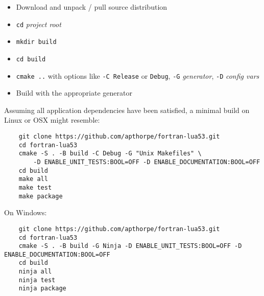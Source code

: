 \begin{itemize}
    \item Download and unpack / pull source distribution
    \item \texttt{cd} \emph{project root}
    \item \texttt{mkdir build}
    \item \texttt{cd build}
    \item \texttt{cmake ..} with options like \texttt{-C Release} or \texttt{Debug}, \texttt{-G} \emph{generator}, \texttt{-D} \emph{config vars}
    \item Build with the appropriate generator
\end{itemize}

Assuming all application dependencies have been satisfied, a minimal
build on Linux or OSX might resemble:

\begin{Verbatim}
    git clone https://github.com/apthorpe/fortran-lua53.git
    cd fortran-lua53
    cmake -S . -B build -C Debug -G "Unix Makefiles" \
        -D ENABLE_UNIT_TESTS:BOOL=OFF -D ENABLE_DOCUMENTATION:BOOL=OFF
    cd build
    make all
    make test
    make package
\end{Verbatim}


On Windows:

\begin{Verbatim}
    git clone https://github.com/apthorpe/fortran-lua53.git
    cd fortran-lua53
    cmake -S . -B build -G Ninja -D ENABLE_UNIT_TESTS:BOOL=OFF -D ENABLE_DOCUMENTATION:BOOL=OFF
    cd build
    ninja all
    ninja test
    ninja package
\end{Verbatim}


